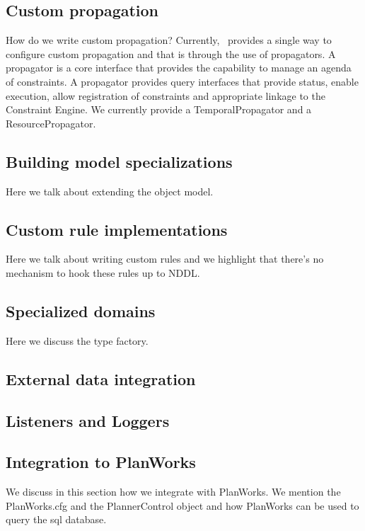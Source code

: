 \documentclass[10pt, letterpaper, twoside]{article}
\begin{document}
\subsection{Custom propagation}

How do we write custom propagation?  Currently, \ET\, provides a single way
to configure custom propagation and that is through the use of
propagators.  A propagator is a core interface that provides the capability
to manage an agenda of constraints.  A propagator provides query interfaces
that provide status, enable execution, allow registration of constraints
and appropriate linkage to the Constraint Engine.  We currently provide a
TemporalPropagator and a ResourcePropagator.

\subsection{Building model specializations}

Here we talk about extending the object model.

\subsection{Custom rule implementations}

Here we talk about writing custom rules and we highlight that there's no
mechanism to hook these rules up to NDDL.

\subsection{Specialized domains}

Here we discuss the type factory.

\subsection{External data integration}


\subsection{Listeners and Loggers}
\subsection{Integration to PlanWorks}

We discuss in this section how we integrate with PlanWorks.  We mention the
PlanWorks.cfg and the PlannerControl object and how PlanWorks can be used
to query the sql database.
\end{document}
